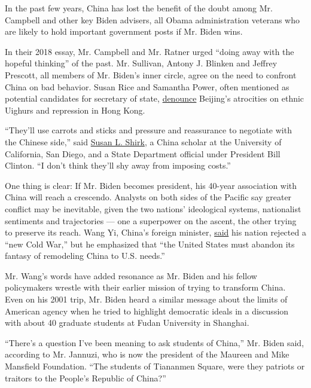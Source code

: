 In the past few years, China has lost the benefit of the doubt among Mr.
Campbell and other key Biden advisers, all Obama administration veterans
who are likely to hold important government posts if Mr. Biden wins.

In their 2018 essay, Mr. Campbell and Mr. Ratner urged ``doing away with
the hopeful thinking'' of the past. Mr. Sullivan, Antony J. Blinken and
Jeffrey Prescott, all members of Mr. Biden's inner circle, agree on the
need to confront China on bad behavior. Susan Rice and Samantha Power,
often mentioned as potential candidates for secretary of state,
\href{https://www.npr.org/2020/08/04/898853269/susan-rice-is-on-bidens-short-list-to-be-his-running-mate}{denounce}
Beijing's atrocities on ethnic Uighurs and repression in Hong Kong.

``They'll use carrots and sticks and pressure and reassurance to
negotiate with the Chinese side,'' said
\href{https://gps.ucsd.edu/faculty-directory/susan-shirk.html}{Susan L.
Shirk}, a China scholar at the University of California, San Diego, and
a State Department official under President Bill Clinton. ``I don't
think they'll shy away from imposing costs.''

One thing is clear: If Mr. Biden becomes president, his 40-year
association with China will reach a crescendo. Analysts on both sides of
the Pacific say greater conflict may be inevitable, given the two
nations' ideological systems, nationalist sentiments and trajectories
--- one a superpower on the ascent, the other trying to preserve its
reach. Wang Yi, China's foreign minister,
\href{https://www.fmprc.gov.cn/mfa_eng/zxxx_662805/t1804328.shtml}{said}
his nation rejected a ``new Cold War,'' but he emphasized that ``the
United States must abandon its fantasy of remodeling China to U.S.
needs.''

Mr. Wang's words have added resonance as Mr. Biden and his fellow
policymakers wrestle with their earlier mission of trying to transform
China. Even on his 2001 trip, Mr. Biden heard a similar message about
the limits of American agency when he tried to highlight democratic
ideals in a discussion with about 40 graduate students at Fudan
University in Shanghai.

``There's a question I've been meaning to ask students of China,'' Mr.
Biden said, according to Mr. Jannuzi, who is now the president of the
Maureen and Mike Mansfield Foundation. ``The students of Tiananmen
Square, were they patriots or traitors to the People's Republic of
China?''

